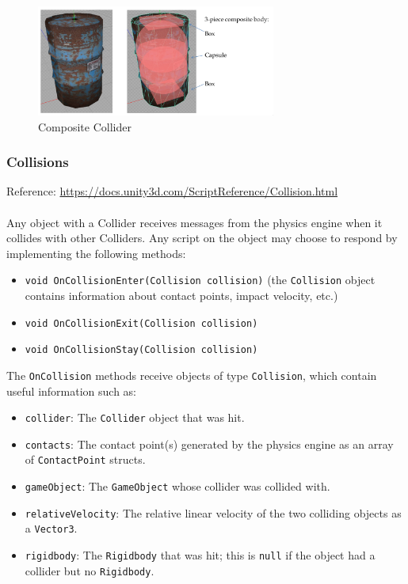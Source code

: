 \documentclass[a4paper,11pt]{article}
\begin{document}
\begin{figure}[H]
    \centering
    \includegraphics[width=0.7\textwidth]{./images/CompositeCollider.png}
    \caption{Composite Collider}
\end{figure}

\subsubsection{Collisions}
Reference: \url{https://docs.unity3d.com/ScriptReference/Collision.html}
\\\\
Any object with a Collider receives messages from the physics engine when it collides with other Colliders.
Any script on the object may choose to respond by implementing the following methods:
\begin{itemize}
    \item   \texttt{void OnCollisionEnter(Collision collision)} (the \verb|Collision| object contains
            information about contact points, impact velocity, etc.)
    \item   \texttt{void OnCollisionExit(Collision collision)}
    \item   \texttt{void OnCollisionStay(Collision collision)}
\end{itemize}

The \verb|OnCollision| methods receive objects of type \verb|Collision|, which contain useful information such as:
\begin{itemize}
    \item   \verb|collider|: The \verb|Collider| object that was hit.
    \item   \verb|contacts|: The contact point(s) generated by the physics engine as an array of
            \verb|ContactPoint| structs.
    \item   \verb|gameObject|: The \verb|GameObject| whose collider was collided with.
    \item   \verb|relativeVelocity|: The relative linear velocity of the two colliding objects as a \verb|Vector3|.
    \item   \verb|rigidbody|: The \verb|Rigidbody| that was hit; this is \verb|null| if the object had a collider
            but no \verb|Rigidbody|.
\end{itemize}
\end{document}
